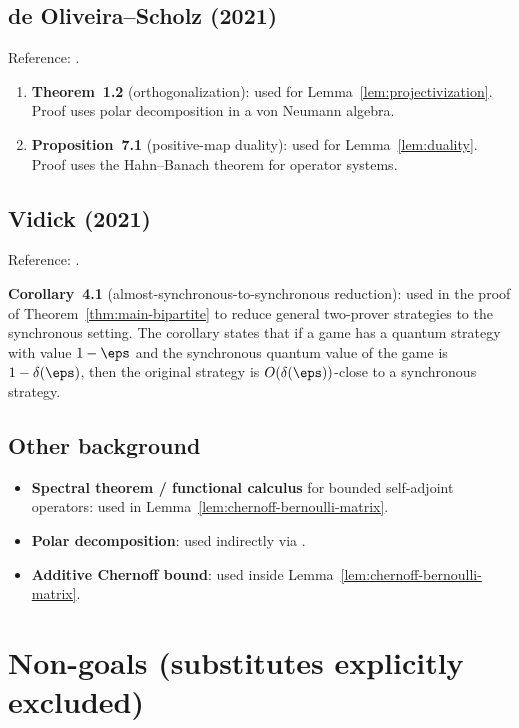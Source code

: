 \section{de Oliveira--Scholz (2021)}

Reference: \cite{de2021orthogonalization}.

\begin{enumerate}
  \item \textbf{Theorem~1.2} (orthogonalization): used for
    Lemma~\ref{lem:projectivization}.
    Proof uses polar decomposition in a von Neumann algebra.

  \item \textbf{Proposition~7.1} (positive-map duality): used for
    Lemma~\ref{lem:duality}.
    Proof uses the Hahn--Banach theorem for operator systems.
\end{enumerate}

\section{Vidick (2021)}

Reference: \cite{vidick2021almost}.

\textbf{Corollary~4.1} (almost-synchronous-to-synchronous reduction):
used in the proof of Theorem~\ref{thm:main-bipartite} to reduce general
two-prover strategies to the synchronous setting.
The corollary states that if a game has a quantum strategy with value $1-\eps$
and the synchronous quantum value of the game is $1-\delta(\eps)$, then the
original strategy is $O(\delta(\eps))$-close to a synchronous strategy.

\section{Other background}

\begin{itemize}
  \item \textbf{Spectral theorem / functional calculus} for bounded
    self-adjoint operators: used in Lemma~\ref{lem:chernoff-bernoulli-matrix}.
  \item \textbf{Polar decomposition}: used indirectly via
    \cite{de2021orthogonalization}.
  \item \textbf{Additive Chernoff bound}: used inside
    Lemma~\ref{lem:chernoff-bernoulli-matrix}.
\end{itemize}


\chapter{Non-goals (substitutes explicitly excluded)}
\label{chap:nongoals}

